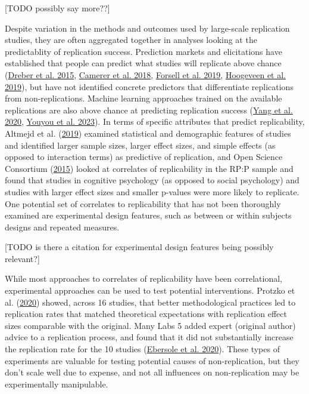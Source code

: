 \documentclass[
  english,
  a4paper,
]{article}
\begin{document}
{[}TODO possibly say more??{]}

Despite variation in the methods and outcomes used by large-scale replication studies, they are often aggregated together in analyses looking at the predictablity of replication success. Prediction markets and elicitations have established that people can predict what studies will replicate above chance (\protect\hyperlink{ref-dreber2015}{Dreber et al. 2015}, \protect\hyperlink{ref-camerer2018}{Camerer et al. 2018}, \protect\hyperlink{ref-forsell2019}{Forsell et al. 2019}, \protect\hyperlink{ref-hoogeveen2019}{Hoogeveen et al. 2019}), but have not identified concrete predictors that differentiate replications from non-replications. Machine learning approaches trained on the available replications are also above chance at predicting replication success (\protect\hyperlink{ref-yang2020}{Yang et al. 2020}, \protect\hyperlink{ref-youyou2023}{Youyou et al. 2023}). In terms of specific attributes that predict replicability, Altmejd et al. (\protect\hyperlink{ref-altmejd2019}{2019}) examined statistical and demographic features of studies and identified larger sample sizes, larger effect sizes, and simple effects (as opposed to interaction terms) as predictive of replication, and Open Science Consortium (\protect\hyperlink{ref-openscienceconsortium2015}{2015}) looked at correlates of replicability in the RP:P sample and found that studies in cognitive psychology (as opposed to social psychology) and studies with larger effect sizes and smaller p-values were more likely to replicate. One potential set of correlates to replicability that has not been thoroughly examined are experimental design features, such as between or within subjects designs and repeated measures.

{[}TODO is there a citation for experimental design features being possibly relevant?{]}

While most approaches to correlates of replicability have been correlational, experimental approaches can be used to test potential interventions. Protzko et al. (\protect\hyperlink{ref-protzko2020}{2020}) showed, across 16 studies, that better methodological practices led to replication rates that matched theoretical expectations with replication effect sizes comparable with the original. Many Labs 5 added expert (original author) advice to a replication process, and found that it did not substantially increase the replication rate for the 10 studies (\protect\hyperlink{ref-ebersole2020}{Ebersole et al. 2020}). These types of experiments are valuable for testing potential causes of non-replication, but they don't scale well due to expense, and not all influences on non-replication may be experimentally manipulable.
\end{document}
